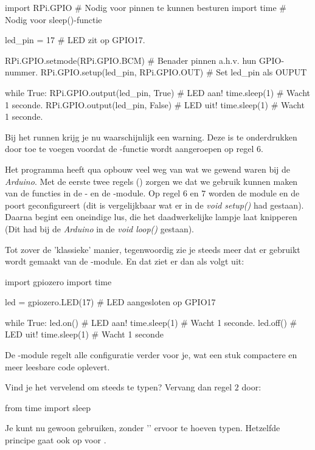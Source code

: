 \begin{python}
import RPi.GPIO  # Nodig voor pinnen te kunnen besturen
import time      # Nodig voor sleep()-functie

led_pin = 17     # LED zit op GPIO17.

RPi.GPIO.setmode(RPi.GPIO.BCM)         # Benader pinnen a.h.v. hun GPIO-nummer.
RPi.GPIO.setup(led_pin, RPi.GPIO.OUT)  # Set led_pin als OUPUT

while True:
    RPi.GPIO.output(led_pin, True)   # LED aan!
    time.sleep(1)                    # Wacht 1 seconde.
    RPi.GPIO.output(led_pin, False)  # LED uit!
    time.sleep(1)                    # Wacht 1 seconde.
\end{python}

\begin{remark}
Bij het runnen krijg je nu waarschijnlijk een warning. Deze is te onderdrukken door  toe te voegen voordat de -functie wordt aangeroepen op regel $6$.
\end{remark}

Het programma heeft qua opbouw veel weg van wat we gewend waren bij de \textit{Arduino}. Met de eerste twee regels () zorgen we dat we gebruik kunnen maken van de functies in de - en de -module. Op regel $6$ en $7$ worden de module en de poort geconfigureert (dit is vergelijkbaar wat er in de \textit{void setup()} had gestaan). Daarna begint een oneindige lus, die het daadwerkelijke lampje laat knipperen (Dit had bij de \textit{Arduino} in de \textit{void loop()} gestaan). \newline

Tot zover de 'klassieke' manier, tegenwoordig zie je steeds meer dat er gebruikt wordt gemaakt van de -module. En dat ziet er dan als volgt uit:
\begin{python}
import gpiozero
import time

led = gpiozero.LED(17)  # LED aangesloten op GPIO17
 
while True: 
    led.on()       # LED aan!
    time.sleep(1)  # Wacht 1 seconde.
    led.off()      # LED uit!
    time.sleep(1)  # Wacht 1 seconde
\end{python}

De -module regelt alle configuratie verder voor je, wat een stuk compactere en meer leesbare code oplevert. 
\begin{remark}
\label{sec:piledobj}
Vind je het vervelend om steeds  te typen? Vervang dan regel $2$ door: 
\begin{python}
from time import sleep
\end{python}
Je kunt nu gewoon  gebruiken, zonder '' ervoor te hoeven typen. Hetzelfde principe gaat ook op voor .
\end{remark}

